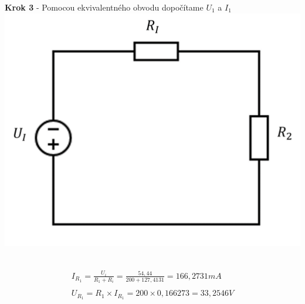 \begin{center}
    \textbf{Krok 3} - Pomocou ekvivalentného obvodu dopočítame $U_1$ a $I_1$
\includegraphics[scale=0.5,keepaspectratio]{fig/pr2_3.png} \
\end{center}

\begin{gather*}
    I_{R_{1}} = \frac {U_{i}} {R_{1} + R_{i}} = \frac {54,44} { 200 + 127,4131} = 166,2731 mA \\\\
    U_{R_{1}} = R_1 \times  I_{R_{1}} = 200 \times 0,166273 = 33,2546 V \\
\end{gather*}

